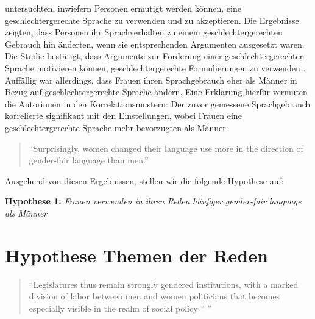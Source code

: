 \documentclass[12pt, 
    twoside=false, 
    bibliography=totoc, 
    numbers=endperiod, 
    headings=normal, 
    toc=chapterentrydotfill
    ]{scrbook}
\begin{document}
\textcite{koeser_2014} untersuchten, inwiefern Personen ermutigt werden können, eine geschlechtergerechte Sprache zu verwenden und zu akzeptieren.   Die Ergebnisse zeigten, dass Personen ihr Sprachverhalten zu einem geschlechtergerechten Gebrauch hin änderten, wenn sie entsprechenden Argumenten ausgesetzt waren. Die Studie bestätigt, dass Argumente zur Förderung einer geschlechtergerechten Sprache motivieren können, geschlechtergerechte Formulierungen zu verwenden \parencite[548]{koeser_2014}. Auffällig war allerdings, dass Frauen ihren Sprachgebrauch eher als Männer in Bezug auf geschlechtergerechte Sprache ändern. Eine Erklärung hierfür vermuten die Autorinnen in den Korrelationsmustern: Der zuvor gemessene Sprachgebrauch korrelierte signifikant mit den Einstellungen, wobei Frauen eine geschlechtergerechte Sprache mehr bevorzugten als Männer\parencite[555]{koeser_2014}.

\citereset
\begin{quote}
    \enquote {Surprisingly, women changed their language use more in the direction of gender-fair language than men.} \parencite[555]{koeser_2014}
\end{quote}


Ausgehend von diesen Ergebnissen, stellen wir die folgende Hypothese auf: 

\textbf{Hypothese 1:} \emph{Frauen verwenden in ihren Reden häufiger gender-fair language als Männer}


\section{Hypothese Themen der Reden}

\begin{quote}
    \enquote{Legislatures thus remain strongly gendered institutions, with a marked division of labor between men and women politicians that becomes especially visible in the realm of social policy ” \parencite[250]{ennser-jedenastik_2017}}
\end{quote}
\end{document}
